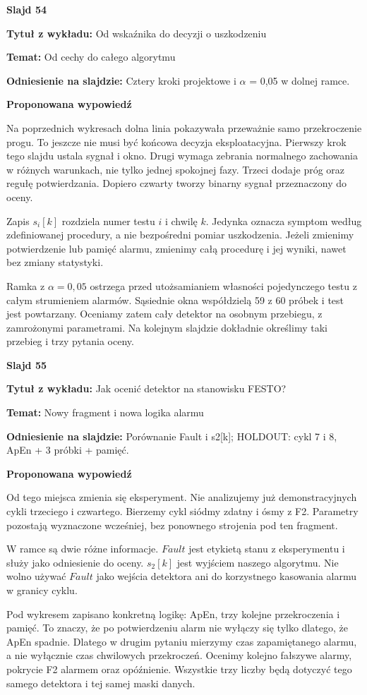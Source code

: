\documentclass[a4paper,11pt]{article}
\newcommand{\NumerSlajdu}{1}
\newcommand{\Komentarz}[3]{%
  \gdef\NumerSlajdu{#1}%
  {\Large\bfseries Slajd #1\par}\smallskip
  \textbf{Tytuł z wykładu:} #2\par
  \textbf{Temat:} #3\par\medskip
}
\begin{document}
\Komentarz{54}{Od wskaźnika do decyzji o uszkodzeniu}{Od cechy do całego algorytmu}
{\small\color{black!65}\textbf{Odniesienie na slajdzie:} Cztery kroki projektowe i \ensuremath{\alpha} = 0,05 w dolnej ramce.\par}
\medskip
\textbf{Proponowana wypowiedź}\par
Na poprzednich wykresach dolna linia pokazywała przeważnie samo przekroczenie progu. To jeszcze nie musi być końcowa decyzja eksploatacyjna. Pierwszy krok tego slajdu ustala sygnał i okno. Drugi wymaga zebrania normalnego zachowania w różnych warunkach, nie tylko jednej spokojnej fazy. Trzeci dodaje próg oraz regułę potwierdzania. Dopiero czwarty tworzy binarny sygnał przeznaczony do oceny.

Zapis $s_i[k]$ rozdziela numer testu $i$ i chwilę $k$. Jedynka oznacza symptom według zdefiniowanej procedury, a nie bezpośredni pomiar uszkodzenia. Jeżeli zmienimy potwierdzenie lub pamięć alarmu, zmienimy całą procedurę i jej wyniki, nawet bez zmiany statystyki.

Ramka z $\alpha=0{,}05$ ostrzega przed utożsamianiem własności pojedynczego testu z całym strumieniem alarmów. Sąsiednie okna współdzielą 59 z 60 próbek i test jest powtarzany. Oceniamy zatem cały detektor na osobnym przebiegu, z zamrożonymi parametrami. Na kolejnym slajdzie dokładnie określimy taki przebieg i trzy pytania oceny.
\clearpage

\Komentarz{55}{Jak ocenić detektor na stanowisku FESTO?}{Nowy fragment i nowa logika alarmu}
{\small\color{black!65}\textbf{Odniesienie na slajdzie:} Porównanie Fault i s2[k]; HOLDOUT: cykl 7 i 8, ApEn + 3 próbki + pamięć.\par}
\medskip
\textbf{Proponowana wypowiedź}\par
Od tego miejsca zmienia się eksperyment. Nie analizujemy już demonstracyjnych cykli trzeciego i czwartego. Bierzemy cykl siódmy zdatny i ósmy z F2. Parametry pozostają wyznaczone wcześniej, bez ponownego strojenia pod ten fragment.

W ramce są dwie różne informacje. $Fault$ jest etykietą stanu z eksperymentu i służy jako odniesienie do oceny. $s_2[k]$ jest wyjściem naszego algorytmu. Nie wolno używać $Fault$ jako wejścia detektora ani do korzystnego kasowania alarmu w granicy cyklu.

Pod wykresem zapisano konkretną logikę: ApEn, trzy kolejne przekroczenia i pamięć. To znaczy, że po potwierdzeniu alarm nie wyłączy się tylko dlatego, że ApEn spadnie. Dlatego w drugim pytaniu mierzymy czas zapamiętanego alarmu, a nie wyłącznie czas chwilowych przekroczeń. Ocenimy kolejno fałszywe alarmy, pokrycie F2 alarmem oraz opóźnienie. Wszystkie trzy liczby będą dotyczyć tego samego detektora i tej samej maski danych.
\clearpage
\end{document}
